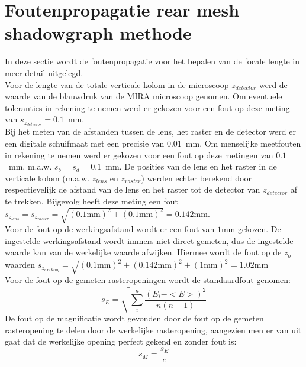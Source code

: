 \documentclass[we,twoside,openright,a4paper,11pt]{uantwerpenbamathesis}
\begin{document}
\appendix

\chapter{Foutenpropagatie rear mesh shadowgraph methode}\label{ch:foutenpropagatie}
In deze sectie wordt de foutenpropagatie voor het bepalen van de focale lengte in meer detail uitgelegd.\\

Voor de lengte van de totale verticale kolom in de microscoop $z_{detector}$ werd de waarde van de blauwdruk van de MIRA microscoop genomen. Om eventuele toleranties in rekening te nemen werd er gekozen voor een fout op deze meting van $s_{z_{detector}}=0.1$~mm.\\

Bij het meten van de afstanden tussen de lens, het raster en de detector werd er een digitale schuifmaat met een precisie van $0.01$~mm. Om menselijke meetfouten in rekening te nemen werd er gekozen voor een fout op deze metingen van $0.1$~mm, m.a.w. $s_{b}=s_{d}=0.1$~mm. De posities van de lens en het raster in de verticale kolom (m.a.w. $z_{lens}$ en $z_{raster}$) werden echter berekend door respectievelijk de afstand van de lens en het raster tot de detector van $z_{detector}$ af te trekken. Bijgevolg heeft deze meting een fout $s_{z_{lens}}=s_{z_{raster}}=\sqrt{(0.1\mathrm{mm})^2+(0.1\mathrm{mm})^2}=0.142\mathrm{mm}$.\\

Voor de fout op de werkingsafstand wordt er een fout van $1\mathrm{mm}$ gekozen. De ingestelde werkingsafstand wordt immers niet direct gemeten, dus de ingestelde waarde kan van de werkelijke waarde afwijken. Hiermee wordt de fout op de $z_o$ waarden $s_{z_{werking}}=\sqrt{(0.1\mathrm{mm})^2+(0.142\mathrm{mm})^2+(1\mathrm{mm})^2}=1.02\mathrm{mm}$\\

Voor de fout op de gemeten rasteropeningen wordt de standaardfout genomen:
\begin{equation*}
    s_E=\sqrt{\sum_i^n \frac{(E_i-<E>)^2}{n(n-1)}}
\end{equation*}
De fout op de magnificatie wordt gevonden door de fout op de gemeten rasteropening te delen door de werkelijke rasteropening, aangezien men er van uit gaat dat de werkelijke opening perfect gekend en zonder fout is:
\begin{equation*}
    s_M=\frac{s_E}{e}
\end{equation*}
\end{document}
